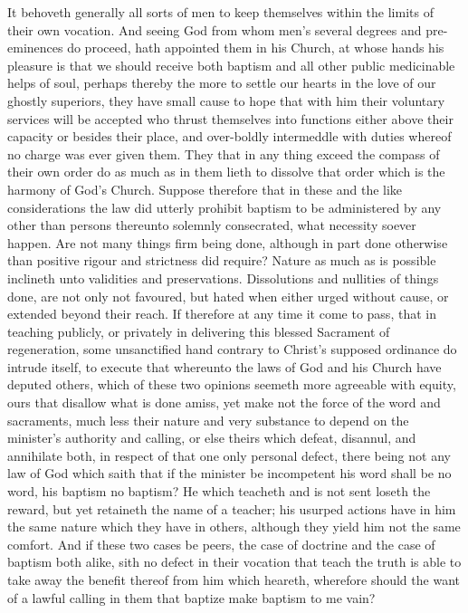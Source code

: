 It behoveth generally all sorts of men to keep themselves within the limits of their own vocation. And seeing God from whom men’s several degrees and pre-eminences do proceed, hath appointed them in his Church, at whose hands his pleasure is that we should receive both baptism and all other public medicinable helps of soul, perhaps thereby the more to settle our hearts in the love of our ghostly superiors, they have small cause to hope that with him their voluntary services will be accepted who thrust themselves into functions either above their capacity or besides their place, and over-boldly intermeddle with duties whereof no charge was ever given them. They that in any thing exceed the compass of their own order do as much as in them lieth to dissolve that order which is the harmony of God’s Church.
Suppose therefore that in these and the like considerations the law did utterly prohibit baptism to be administered by any other than persons thereunto solemnly consecrated, what necessity soever happen. Are not many things firm being  done, although in part done otherwise than positive rigour and strictness did require? Nature as much as is possible inclineth unto validities and preservations. Dissolutions and nullities of things done, are not only not favoured, but hated when either urged without cause, or extended beyond their reach.
If therefore at any time it come to pass, that in teaching publicly, or privately in delivering this blessed Sacrament of regeneration, some unsanctified hand contrary to Christ’s supposed ordinance do intrude itself, to execute that whereunto the laws of God and his Church have deputed others, which of these two opinions seemeth more agreeable with equity, ours that disallow what is done amiss, yet make not the force of the word and sacraments, much less their nature and very substance to depend on the minister’s authority and calling, or else theirs which defeat, disannul, and annihilate both, in respect of that one only personal defect, there being not any law of God which saith that if the minister be incompetent his word shall be no word, his baptism no baptism? He which teacheth and is not sent loseth the reward, but yet retaineth the name of a teacher; his usurped actions have in him the same nature which they have in others, although they yield him not the same comfort. And if these two cases be peers, the case of doctrine and the case of baptism both alike, sith no defect in their vocation that teach the truth is able to take away the benefit thereof from  him which heareth, wherefore should the want of a lawful calling in them that baptize make baptism to me vain?
